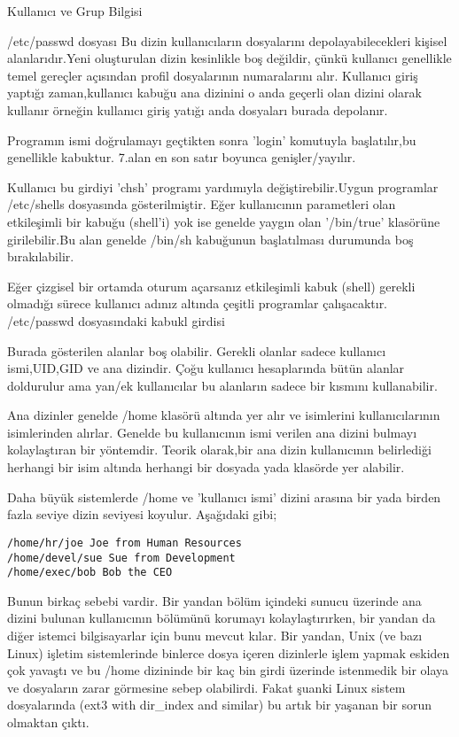 \begin{section}{Kullanıcı ve Grup Bilgisi}
\begin{subsection}{/etc/passwd dosyası}
Bu dizin kullanıcıların dosyalarını depolayabilecekleri kişisel alanlarıdır.Yeni oluşturulan dizin kesinlikle boş değildir, çünkü kullanıcı genellikle temel gereçler açısından profil dosyalarının numaralarını alır.
Kullanıcı giriş yaptığı zaman,kullanıcı kabuğu ana dizinini o anda geçerli olan dizini olarak kullanır örneğin kullanıcı giriş yatığı anda dosyaları burada depolanır.

Programın ismi doğrulamayı geçtikten sonra 'login' komutuyla başlatılır,bu genellikle kabuktur. 7.alan en son satır boyunca genişler/yayılır.

Kullanıcı bu girdiyi 'chsh' programı yardımıyla değiştirebilir.Uygun programlar /etc/shells dosyasında gösterilmiştir. Eğer kullanıcının parametleri olan etkileşimli bir kabuğu (shell'i) yok ise genelde yaygın olan '/bin/true' klasörüne
girilebilir.Bu alan genelde /bin/sh kabuğunun başlatılması durumunda boş bırakılabilir.

Eğer çizgisel bir ortamda oturum açarsanız etkileşimli kabuk (shell) gerekli olmadığı sürece kullanıcı adınız altında çeşitli programlar çalışacaktır. /etc/passwd dosyasındaki kabukl girdisi


Burada gösterilen alanlar boş olabilir. Gerekli olanlar sadece kullanıcı ismi,UID,GID ve ana dizindir. Çoğu kullanıcı hesaplarında bütün alanlar doldurulur ama yan/ek kullanıcılar bu alanların sadece bir kısmını kullanabilir.

Ana dizinler genelde /home klasörü altında yer alır ve isimlerini kullanıcılarının isimlerinden alırlar. Genelde bu kullanıcının ismi verilen ana dizini bulmayı kolaylaştıran bir yöntemdir. Teorik olarak,bir ana dizin kullanıcının belirlediği
herhangi bir isim altında herhangi bir dosyada yada klasörde yer alabilir.

Daha büyük sistemlerde /home ve 'kullanıcı ismi' dizini arasına bir yada birden fazla seviye dizin seviyesi koyulur. Aşağıdaki gibi;
\begin{verbatim}
/home/hr/joe Joe from Human Resources
/home/devel/sue Sue from Development
/home/exec/bob Bob the CEO
\end{verbatim}

Bunun birkaç sebebi vardir. Bir yandan bölüm içindeki sunucu üzerinde ana dizini bulunan kullanıcının bölümünü korumayı kolaylaştırırken, bir yandan da diğer istemci bilgisayarlar için bunu mevcut kılar. Bir yandan, Unix (ve bazı Linux) işletim sistemlerinde binlerce dosya içeren dizinlerle işlem yapmak eskiden çok yavaştı ve bu /home dizininde bir kaç bin girdi üzerinde istenmedik bir olaya
ve dosyaların zarar görmesine sebep olabilirdi. Fakat şuanki Linux sistem dosyalarında (ext3 with dir\_index and similar) bu artık bir yaşanan bir sorun olmaktan çıktı.


\end{subsection}
\end{section}
